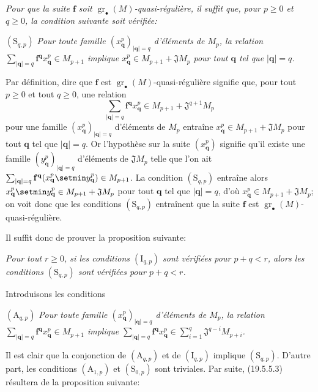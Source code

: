 \begin{env}[19.5.5.2]
\label{IV.19.5.5.2}
\emph{Pour que la suite $\mathbf f$ soit $\operatorname{gr}_\bullet(M)$-quasi-régulière, il suffit que, pour $p\geq0$ et $q\geq0$, la condition suivante soit vérifiée:}

$(\mathrm S_{q,p})$ \emph{Pour toute famille $(x_{\mathbf q}^p)_{|\mathbf q|=q}$ d'éléments de $M_p$, la relation $\sum_{|\mathbf q|=q}\mathbf f^{\mathbf q}x_{\mathbf q}^p\in M_{p+1}$ implique $x_{\mathbf q}^p\in M_{p+1}+\mathfrak JM_p$ pour tout $\mathbf q$ tel que $|\mathbf q|=q$.}

Par définition, dire que $\mathbf f$ est $\operatorname{gr}_\bullet(M)$-quasi-régulière signifie que, pour tout $p\geq0$ et tout $q\geq0$, une relation
\[
  \sum_{|\mathbf q|=q}\mathbf f^{\mathbf q}x_{\mathbf q}^p\in M_{p+1}+\mathfrak J^{q+1}M_p
\]
pour une famille $(x_{\mathbf q}^p)_{|\mathbf q|=q}$ d'éléments de $M_p$ entraîne $x_{\mathbf q}^p\in M_{p+1}+\mathfrak JM_p$ pour tout $\mathbf q$ tel que $|\mathbf q|=q$. Or l'hypothèse sur la suite $(x_{\mathbf q}^p)$ signifie qu'il existe une famille $(y_{\mathbf q}^p)_{|\mathbf q|=q}$ d'éléments de $\mathfrak JM_p$ telle que l'on ait $\sum_{|\mathbf q|=q}\mathbf f^{\mathbf q}(x_{\mathbf q}^p\setmin y_{\mathbf q}^p)\in M_{p+1}$. La condition $(\mathrm S_{q,p})$ entraîne alors $x_{\mathbf q}^p\setmin y_{\mathbf q}^p\in M_{p+1}+\mathfrak JM_p$ pour tout $\mathbf q$ tel que $|\mathbf q|=q$, d'où $x_{\mathbf q}^p\in M_{p+1}+\mathfrak JM_p$; on voit donc que les conditions $(\mathrm S_{q,p})$ entraînent que la suite $\mathbf f$ est $\operatorname{gr}_\bullet(M)$-quasi-régulière.
\end{env}

Il suffit donc de prouver la proposition suivante:

\begin{env}[19.5.5.3]
\label{IV.19.5.5.3}
\emph{Pour tout $r\geq0$, si les conditions $(\mathrm I_{q,p})$ sont vérifiées pour $p+q<r$, alors les conditions $(\mathrm S_{q,p})$ sont vérifiées pour $p+q<r$.}

Introduisons les conditions

$(\mathrm A_{q,p})$ \emph{Pour toute famille $(x_{\mathbf q}^p)_{|\mathbf q|=q}$ d'éléments de $M_p$, la relation $\sum_{|\mathbf q|=q}\mathbf f^{\mathbf q}x_{\mathbf q}^p\in M_{p+1}$ implique $\sum_{|\mathbf q|=q}\mathbf f^{\mathbf q}x_{\mathbf q}^p\in\sum_{i=1}^q\mathfrak J^{q-i}M_{p+i}$.}

Il est clair que la conjonction de $(\mathrm A_{q,p})$ et de $(\mathrm I_{q,p})$ implique $(\mathrm S_{q,p})$. D'autre part, les conditions $(\mathrm A_{1,p})$ et $(\mathrm S_{0,p})$ sont triviales. Par suite, (19.5.5.3) résultera de la proposition suivante:
\end{env}

